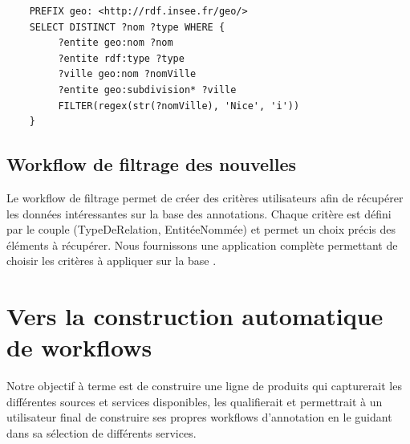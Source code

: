 \documentclass[]{easychair}
\newcommand{\comment}[4]{\par\noindent\hspace*{-0.5cm}{\parbox{\columnwidth}{\textbf{\color{#1}//#2[#3]:#4}}}\par}
\newcommand{\mi}[1]{\comment{blue}{}{#1}{MI}}
\begin{document}
\begin{verbatim}
    PREFIX geo: <http://rdf.insee.fr/geo/>
    SELECT DISTINCT ?nom ?type WHERE {
	     ?entite geo:nom ?nom
	     ?entite rdf:type ?type
	     ?ville geo:nom ?nomVille
         ?entite geo:subdivision* ?ville
         FILTER(regex(str(?nomVille), 'Nice', 'i'))
    }
\end{verbatim}



\subsection{Workflow de filtrage des nouvelles}
Le workflow de filtrage permet de créer des critères utilisateurs afin de récupérer les données intéressantes sur la base des annotations. Chaque critère est défini par le couple (TypeDeRelation, EntitéeNommée) et permet un choix précis des éléments à récupérer. Nous fournissons une application complète permettant de choisir les critères à appliquer sur la base \cite{Christophe}.


\section{Vers la construction automatique de workflows }
\label{sect:perspectives}
Notre objectif à terme est de construire une ligne de produits qui capturerait les différentes sources et services disponibles, les qualifierait et permettrait à un utilisateur final de construire ses propres workflows d'annotation en le guidant dans sa sélection de différents services.
\end{document}
